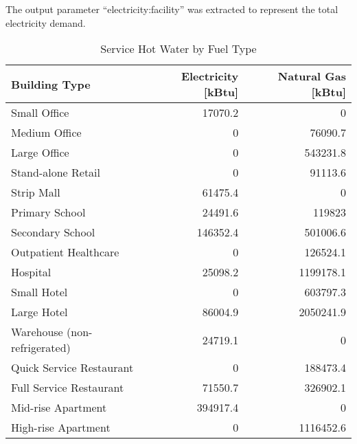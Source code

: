 The output parameter ``electricity:facility'' was extracted to
represent the total electricity demand.

\begin{table}[h!]
\centering
\caption{Service Hot Water by Fuel Type}
\label{tab:hotWater}
\begin{tabular}{l|r|r}
  \hline
Building Type                & Electricity {[}kBtu{]} & Natural Gas {[}kBtu{]} \\
  \hline
  \hline
Small Office                 & 17070.2                & 0                      \\
Medium Office                & 0                      & 76090.7                \\
Large Office                 & 0                      & 543231.8               \\
Stand-alone Retail           & 0                      & 91113.6                \\
Strip Mall                   & 61475.4                & 0                      \\
Primary School               & 24491.6                & 119823                 \\
Secondary School             & 146352.4               & 501006.6               \\
Outpatient Healthcare        & 0                      & 126524.1               \\
Hospital                     & 25098.2                & 1199178.1              \\
Small Hotel                  & 0                      & 603797.3               \\
Large Hotel                  & 86004.9                & 2050241.9              \\
Warehouse (non-refrigerated) & 24719.1                & 0                      \\
Quick Service Restaurant     & 0                      & 188473.4               \\
Full Service Restaurant      & 71550.7                & 326902.1               \\
Mid-rise Apartment           & 394917.4               & 0                      \\
High-rise Apartment          & 0                      & 1116452.6              \\
  \hline
\end{tabular}
\end{table}

\pagebreak
